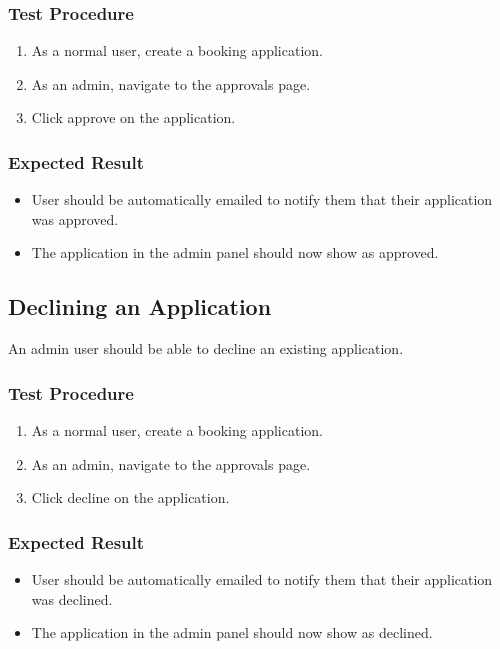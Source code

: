 \documentclass[a4paper, draft]{article}
\begin{document}
\subsubsection{Test Procedure}
\begin{enumerate}
  \item As a normal user, create a booking application.
  \item As an admin, navigate to the approvals page.
  \item Click approve on the application.
\end{enumerate}

\subsubsection{Expected Result}
\begin{itemize}
  \item User should be automatically emailed to notify them that their application was approved.
  \item The application in the admin panel should now show as approved.
\end{itemize}

\subsection{Declining an Application}
An admin user should be able to decline an existing application.

\subsubsection{Test Procedure}
\begin{enumerate}
  \item As a normal user, create a booking application.
  \item As an admin, navigate to the approvals page.
  \item Click decline on the application.
\end{enumerate}

\subsubsection{Expected Result}
\begin{itemize}
  \item User should be automatically emailed to notify them that their application was declined.
  \item The application in the admin panel should now show as declined.
\end{itemize}
\end{document}
